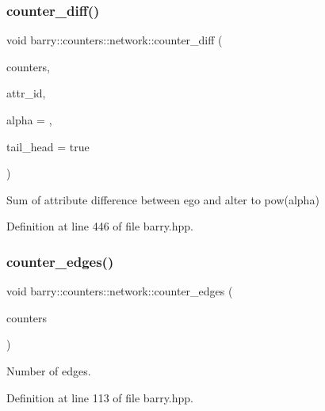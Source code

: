 \subsubsection{\texorpdfstring{counter\+\_\+diff()}{counter\_diff()}}
{\footnotesize\ttfamily void barry\+::counters\+::network\+::counter\+\_\+diff (\begin{DoxyParamCaption}\item[{\hyperlink{namespacebarry_1_1counters_1_1network_a3b3c590303d47840d1967372ae495d95}{Net\+Counter\+Vector} $\ast$}]{counters,  }\item[{\hyperlink{namespacebarry_a11dfc53ddb4672278319aa04f1e09a6c}{uint}}]{attr\+\_\+id,  }\item[{double}]{alpha = {},  }\item[{double}]{tail\+\_\+head = {\ttfamily true} }\end{DoxyParamCaption})\hspace{0.3cm}{\ttfamily [inline]}}



Sum of attribute difference between ego and alter to pow(alpha) 



Definition at line 446 of file barry.\+hpp.

\mbox{\label{namespacebarry_1_1counters_1_1network_a3c0a9e6c5697b3ec65827d405826bb33}} 
\subsubsection{\texorpdfstring{counter\+\_\+edges()}{counter\_edges()}}
{\footnotesize\ttfamily void barry\+::counters\+::network\+::counter\+\_\+edges (\begin{DoxyParamCaption}\item[{\hyperlink{namespacebarry_1_1counters_1_1network_a3b3c590303d47840d1967372ae495d95}{Net\+Counter\+Vector} $\ast$}]{counters }\end{DoxyParamCaption})\hspace{0.3cm}{\ttfamily [inline]}}



Number of edges. 



Definition at line 113 of file barry.\+hpp.

